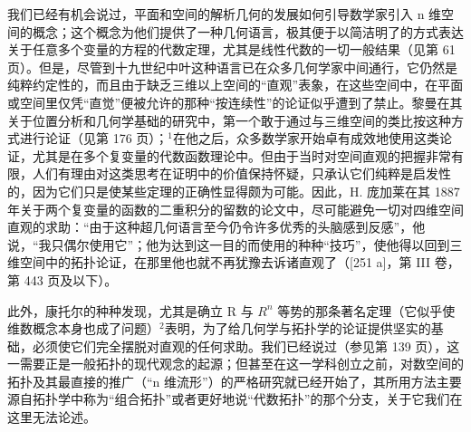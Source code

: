 我们已经有机会说过，平面和空间的解析几何的发展如何引导数学家引入 n 维空间的概念；这个概念为他们提供了一种几何语言，极其便于以简洁明了的方式表达关于任意多个变量的方程的代数定理，尤其是线性代数的一切一般结果（见第 61 页）。但是，尽管到十九世纪中叶这种语言已在众多几何学家中间通行，它仍然是纯粹约定性的，而且由于缺乏三维以上空间的“直观”表象，在这些空间中，在平面或空间里仅凭“直觉”便被允许的那种“按连续性”的论证似乎遭到了禁止。黎曼在其关于位置分析和几何学基础的研究中，第一个敢于通过与三维空间的类比按这种方式进行论证（见第 176 页）；\(^{1}\)在他之后，众多数学家开始卓有成效地使用这类论证，尤其是在多个复变量的代数函数理论中。但由于当时对空间直观的把握非常有限，人们有理由对这类思考在证明中的价值保持怀疑，只承认它们纯粹是启发性的，因为它们只是使某些定理的正确性显得颇为可能。因此，H. 庞加莱在其 1887 年关于两个复变量的函数的二重积分的留数的论文中，尽可能避免一切对四维空间直观的求助：“由于这种超几何语言至今仍令许多优秀的头脑感到反感”，他说，“我只偶尔使用它”；他为达到这一目的而使用的种种“技巧”，使他得以回到三维空间中的拓扑论证，在那里他也就不再犹豫去诉诸直观了（{[}251 a{]}，第 III 卷，第 443 页及以下）。

此外，康托尔的种种发现，尤其是确立 R 与 \(R^{n}\) 等势的那条著名定理（它似乎使维数概念本身也成了问题）\(^{2}\)表明，为了给几何学与拓扑学的论证提供坚实的基础，必须使它们完全摆脱对直观的任何求助。我们已经说过（参见第 139 页），这一需要正是一般拓扑的现代观念的起源；但甚至在这一学科创立之前，对数空间的拓扑及其最直接的推广（“n 维流形”）的严格研究就已经开始了，其所用方法主要源自拓扑学中称为“组合拓扑”或者更好地说“代数拓扑”的那个分支，关于它我们在这里无法论述。
